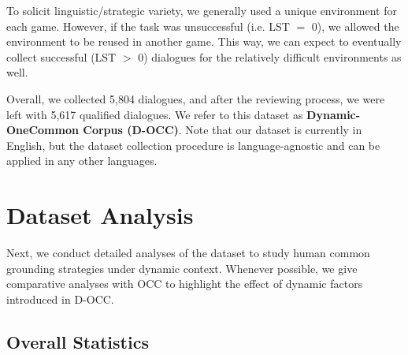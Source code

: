 To solicit linguistic/strategic variety, we generally used a unique environment for each game. However, if the task was unsuccessful (i.e. LST $=$ 0), we allowed the environment to be reused in another game. This way, we can expect to eventually collect successful (LST $>$ 0) dialogues for the relatively difficult environments as well.

Overall, we collected 5,804 dialogues, and after the reviewing process, we were left with 5,617 qualified dialogues. We refer to this dataset as \textbf{Dynamic-OneCommon Corpus (D-OCC)}. Note that our dataset is currently in English, but the dataset collection procedure is language-agnostic and can be applied in any other languages.


\section{Dataset Analysis}
\label{06_sec:dataset_analysis}

Next, we conduct detailed analyses of the dataset to study human common grounding strategies under dynamic context. Whenever possible, we give comparative analyses with OCC to highlight the effect of dynamic factors introduced in D-OCC.

\subsection{Overall Statistics}
\label{06_sec:overall_statistics}

\begin{table}[th!]
\centering {}
\caption{
Statistics of OCC and D-OCC datasets.
}
\label{06_tab:onecommon_statistics}
\end{table}

